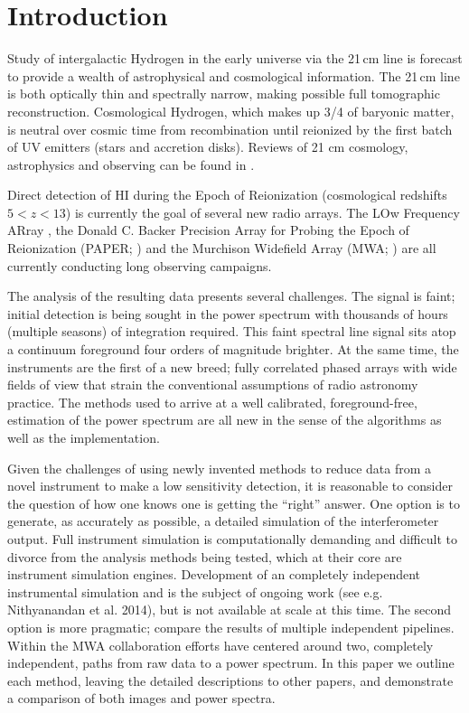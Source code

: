 \documentclass[preprint2]{aastex}
\begin{document}




\section{Introduction} 
  Study of intergalactic Hydrogen  in the early universe via the 21\,cm line is forecast to provide a wealth of astrophysical and cosmological information.  The 21\,cm line is both optically thin and spectrally narrow, making possible full tomographic reconstruction. Cosmological Hydrogen, which makes up 3/4 of baryonic matter, is neutral over cosmic time from recombination until reionized by the first batch of UV emitters (stars and accretion disks).  Reviews of 21 cm cosmology, astrophysics and observing can be found in \cite{Morales:2010p8093,Furlanetto:2006p2267,Pritchard:2012p9555,zaroubi2013epoch}.
  
Direct detection of HI during the Epoch of Reionization (cosmological redshifts $5<z<13$) is currently the goal of several new radio arrays. The LOw Frequency ARray \citep[LOFAR;]{Yatawatta:2013p9699}, the Donald C. Backer Precision Array for Probing the Epoch of Reionization (PAPER; \citet{Parsons:2014p10499}) and the Murchison Widefield Array (MWA; ) are all currently conducting long observing campaigns.

The analysis of the resulting data presents several challenges. The signal is faint; initial detection is being sought in the power spectrum with thousands of hours (multiple seasons) of integration required. This faint spectral line signal sits atop a continuum foreground four orders of magnitude brighter. At the same time, the instruments are the first of a new breed; fully correlated phased arrays with wide fields of view that strain the conventional assumptions of radio astronomy practice. The methods used to arrive at a well calibrated, foreground-free, estimation of the power spectrum are all new in the sense of the algorithms as well as the implementation.  

Given the challenges of using newly invented methods to reduce data from a novel instrument to make a low sensitivity detection, it is reasonable to consider the question of how one knows one is getting the ``right'' answer.  One option is to generate, as accurately as possible, a detailed simulation of the interferometer output. Full instrument simulation is computationally demanding and difficult to divorce from the analysis methods being tested, which at their core are instrument simulation engines. Development of an completely independent instrumental simulation and is the subject of ongoing work (see e.g. Nithyanandan et al. 2014), but is not available at scale at this time.  The second option is more pragmatic; compare the results of multiple independent pipelines.  Within the MWA collaboration efforts have centered around two, completely independent, paths from raw data to a power spectrum.  In this paper we outline each method, leaving the detailed descriptions to other papers, and demonstrate a comparison of both images and power spectra. 
\end{document}
